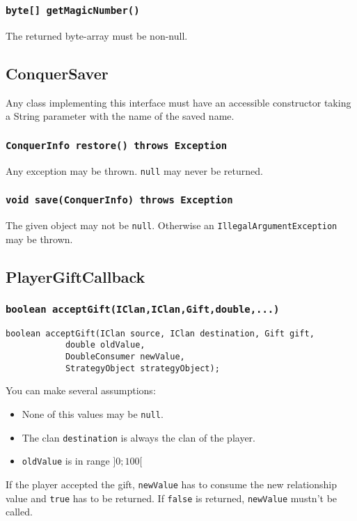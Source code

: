 \documentclass{article}
\begin{document}
\subsubsection{\texttt{byte[] getMagicNumber()}}
The returned byte-array must be non-null.

\subsection{ConquerSaver}

Any class implementing this interface must have an accessible constructor taking a String parameter
with the name of the saved name.

\subsubsection{\texttt{ConquerInfo restore() throws Exception}}
Any exception may be thrown. \texttt{null} may never be returned.

\subsubsection{\texttt{void save(ConquerInfo) throws Exception}}
The given object may not be \texttt{null}. Otherwise an \texttt{IllegalArgumentException} may be thrown.

\subsection{PlayerGiftCallback}

\subsubsection{\texttt{boolean acceptGift(IClan,IClan,Gift,double,...)}}
\begin{verbatim}
boolean acceptGift(IClan source, IClan destination, Gift gift,
			double oldValue,
			DoubleConsumer newValue,
			StrategyObject strategyObject);
\end{verbatim}
You can make several assumptions:
\begin{itemize}
	\item None of this values may be \texttt{null}.
	\item The clan \texttt{destination} is always the clan of the player.
	\item \texttt{oldValue} is in range $]0;100[$
\end{itemize}

If the player accepted the gift, \texttt{newValue} has to consume the new relationship value and
\texttt{true} has to be returned.
If \texttt{false} is returned, \texttt{newValue} mustn't be called.
\end{document}

